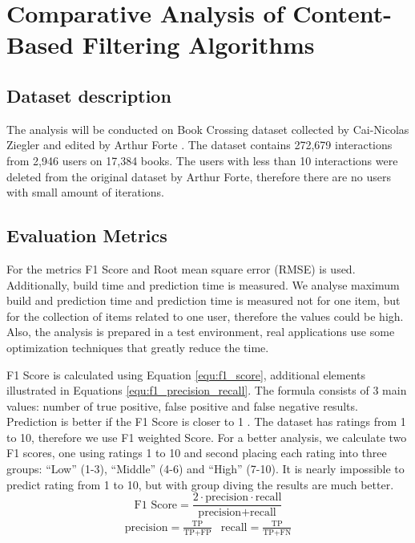 \section{Comparative Analysis of Content-Based Filtering Algorithms}\label{sec:dataset_analysis}

\subsection{Dataset description} %
The analysis will be conducted on Book Crossing dataset collected by Cai-Nicolas Ziegler and edited by Arthur Forte \cite{Dataset}. The dataset contains 272,679 interactions from 2,946 users on 17,384 books. The users with less than 10 interactions were deleted from the original dataset by Arthur Forte, therefore there are no users with small amount of iterations.

\subsection{Evaluation Metrics} %
For the metrics F1 Score and Root mean square error (RMSE) is used. Additionally, build time and prediction time is measured. We analyse maximum build and prediction time and prediction time is measured not for one item, but for the collection of items related to one user, therefore the values could be high. Also, the analysis is prepared in a test environment, real applications use some optimization techniques that greatly reduce the time.

F1 Score is calculated using Equation \eqref{equ:f1_score}, additional elements illustrated in Equations \eqref{equ:f1_precision_recall}. The formula consists of 3 main values: number of true positive, false positive and false negative results. Prediction is better if the F1 Score is closer to 1 \cite{F1Score}. The dataset has ratings from 1 to 10, therefore we use F1 weighted Score. For a better analysis, we calculate two F1 scores, one using ratings 1 to 10 and second placing each rating into three groups: “Low” (1-3), “Middle” (4-6) and “High” (7-10). It is nearly impossible to predict rating from 1 to 10, but with group diving the results are much better.
\begin{equation}
        \text{F1 Score} = \frac{2 \cdot \text{precision} \cdot \text{recall}}{\text{precision} + \text{recall}}\label{equ:f1_score}
\end{equation}
\begin{align}
        &\text{precision} = \frac{\text{TP}}{\text{TP} + \text{FP}} &
        \text{recall} = \frac{\text{TP}}{\text{TP} + \text{FN}} &\label{equ:f1_precision_recall}
\end{align}

